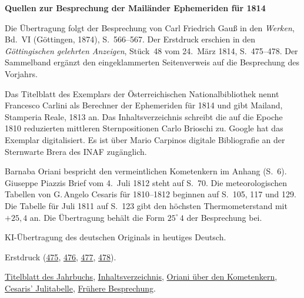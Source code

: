 \clearpage\thispagestyle{empty}
\begin{center}\Large\bfseries Quellen zur Besprechung der Mailänder Ephemeriden für 1814\end{center}

Die Übertragung folgt der Besprechung von Carl Friedrich Gauß in den \emph{Werken}, Bd.~VI (Göttingen, 1874), S.~566--567. Der Erstdruck erschien in den \emph{Göttingischen gelehrten Anzeigen}, Stück~48 vom 24.~März 1814, S.~475--478. Der Sammelband ergänzt den eingeklammerten Seitenverweis auf die Besprechung des Vorjahrs.

Das Titelblatt des Exemplars der Österreichischen Nationalbibliothek nennt Francesco Carlini als Berechner der Ephemeriden für 1814 und gibt Mailand, Stamperia Reale, 1813 an. Das Inhaltsverzeichnis schreibt die auf die Epoche 1810 reduzierten mittleren Sternpositionen Carlo Brioschi zu. Google hat das Exemplar digitalisiert. Es ist über Mario Carpinos digitale Bibliografie an der Sternwarte Brera des INAF zugänglich.

Barnaba Oriani bespricht den vermeintlichen Kometenkern im Anhang (S.~6). Giuseppe Piazzis Brief vom 4.~Juli 1812 steht auf S.~70. Die meteorologischen Tabellen von G.\,Angelo Cesaris für 1810--1812 beginnen auf S.~105, 117 und 129. Die Tabelle für Juli 1811 auf S.~123 gibt den höchsten Thermometerstand mit $+25{,}4$ an. Die Übertragung behält die Form $25^\circ\,4$ der Besprechung bei.

KI-Übertragung des deutschen Originals in heutiges Deutsch.

Erstdruck (\href{https://images.p.sub.uni-goettingen.de/iiif/image/gdz:PPN319721507_1814:00000477/full/1650,/0/default.jpg}{475}, \href{https://images.p.sub.uni-goettingen.de/iiif/image/gdz:PPN319721507_1814:00000478/full/1650,/0/default.jpg}{476}, \href{https://images.p.sub.uni-goettingen.de/iiif/image/gdz:PPN319721507_1814:00000479/full/1650,/0/default.jpg}{477}, \href{https://images.p.sub.uni-goettingen.de/iiif/image/gdz:PPN319721507_1814:00000480/full/1650,/0/default.jpg}{478}).

\href{https://www1.brera.inaf.it/~mario.carpino/Biblioteca_Digitale/Effemeridi_Milano/mirror/EM1814b.pdf#page=6}{Titelblatt des Jahrbuchs}, \href{https://www1.brera.inaf.it/~mario.carpino/Biblioteca_Digitale/Effemeridi_Milano/mirror/EM1814b.pdf#page=12}{Inhaltsverzeichnis}, \href{https://www1.brera.inaf.it/~mario.carpino/Biblioteca_Digitale/Effemeridi_Milano/mirror/EM1814b.pdf#page=139}{Oriani über den Kometenkern}, \href{https://www1.brera.inaf.it/~mario.carpino/Biblioteca_Digitale/Effemeridi_Milano/mirror/EM1814b.pdf#page=256}{Cesaris’ Julitabelle}, \href{https://images.p.sub.uni-goettingen.de/iiif/image/gdz:PPN319721507_1813:00000949/full/1650,/0/default.jpg}{Frühere Besprechung}.

\clearpage
